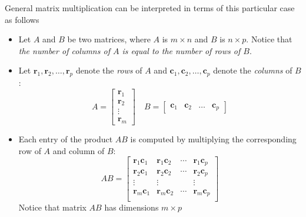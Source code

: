 \documentclass[12pt]{article}
\begin{document}
General matrix multiplication can be interpreted in terms of this particular case as follows
\begin{itemize}
\item Let $A$ and $B$ be two matrices, where $A$ is $m\times n$ and $B$ is $n\times p$. Notice that \emph{the number of columns of $A$ is equal to the number of rows of $B$}.
\item Let $\mathbf{r}_1,\mathbf{r}_2,\ldots,\mathbf{r}_p$ denote the \emph{rows} of $A$ and
$\mathbf{c}_1,\mathbf{c}_2,\ldots,\mathbf{c}_p$ denote the \emph{columns} of $B$:
\[
A=
\begin{bmatrix}\mathbf{r}_1\\\mathbf{r}_2\\\vdots\\\mathbf{r}_m\end{bmatrix}\quad
B=
\begin{bmatrix}\mathbf{c}_1&\mathbf{c}_2&\ldots&\mathbf{c}_p\end{bmatrix}
\]
\item Each entry of the product $AB$ is computed by multiplying the corresponding row of $A$ and column of $B$:
\[
AB=\begin{bmatrix}
\mathbf{r}_1\mathbf{c}_1&\mathbf{r}_1\mathbf{c}_2&\cdots&\mathbf{r}_1\mathbf{c}_p\\
\mathbf{r}_2\mathbf{c}_1&\mathbf{r}_2\mathbf{c}_2&\cdots&\mathbf{r}_2\mathbf{c}_p\\
\vdots&\vdots&&\vdots\\
\mathbf{r}_m\mathbf{c}_1&\mathbf{r}_m\mathbf{c}_2&\cdots&\mathbf{r}_m\mathbf{c}_p\\
\end{bmatrix}
\]
Notice that matrix $AB$ has dimensions $m\times p$
\end{itemize}
\end{document}
